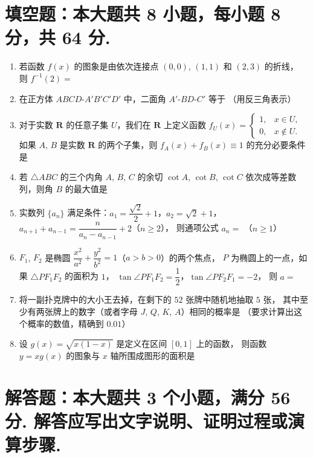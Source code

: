 \documentclass{chsmc}
\begin{document}
\section{填空题：本大题共 8 小题，每小题 8 分，共 64 分.}

\begin{enumerate}
	\item 若函数 $f(x)$ 的图象是由依次连接点 $(0,0)$, $(1,1)$ 和 $(2,3)$ 的折线，
		则 $f^{-1}(2) =$ \blankline
	\item 在正方体 $ABCD$-$A'B'C'D'$ 中，二面角 $A'$-$BD$-$C'$ 等于 \blankline
		（用反三角表示）
	\item 对于实数 $\mathbf{R}$ 的任意子集 $U$，我们在 $\mathbf{R}$ 上定义函数
		$f_U(x) = \begin{cases}
			1, & x \in U, \\
			0, & x \notin U.
		\end{cases}$
		如果 $A$, $B$ 是实数 $\mathbf{R}$ 的两个子集，则
		$f_A(x) + f_B(x) \equiv 1$ 的充分必要条件是 \blankline
	\item 若 $\triangle ABC$ 的三个内角 $A$, $B$, $C$ 的余切
		$\cot A$, $\cot B$, $\cot C$ 依次成等差数列，则角 $B$ 的最大值是 \blankline
	\item 实数列 $\{a_n\}$ 满足条件：$a_1 = \dfrac{\sqrt{2}}{2} + 1$，$a_2 = \sqrt{2} + 1$，
		$a_{n+1} + a_{n-1} = \dfrac{n}{a_n-a_{n-1}} + 2$（$n \geqslant 2$），
		则通项公式 $a_n =$ \blankline（$n \geqslant 1$）
	\item $F_1$, $F_2$ 是椭圆 $\dfrac{x^2}{a^2} + \dfrac{y^2}{b^2} = 1$（$a > b > 0$）的两个焦点，
		$P$ 为椭圆上的一点，如果 $\triangle PF_1F_2$ 的面积为 $1$，
		$\tan \angle PF_1F_2 = \dfrac{1}{2}$，$\tan \angle PF_2F_1 = -2$，
		则 $a =$ \blankline
	\item 将一副扑克牌中的大小王去掉，在剩下的 $52$ 张牌中随机地抽取 $5$ 张，
		其中至少有两张牌上的数字（或者字母 $J$, $Q$, $K$, $A$）相同的概率是 \blankline
		（要求计算出这个概率的数值，精确到 $0.01$）
	\item 设 $g(x) = \sqrt{x(1-x)}$ 是定义在区间 $[0,1]$ 上的函数，
		则函数 $y = xg(x)$ 的图象与 $x$ 轴所围成图形的面积是 \blankline
\end{enumerate}

\section{解答题：本大题共 3 个小题，满分 56 分. 解答应写出文字说明、证明过程或演算步骤.}
\end{document}
